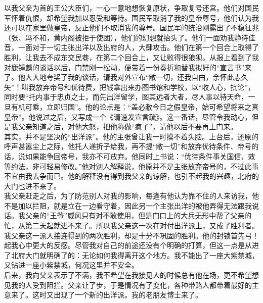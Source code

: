以我父亲为首的王公大臣们，一心一意地想恢复原状，争取复号还宫。他们对国民军怀着仇恨，却希望我加以忍受和等待。国民军取消了我的皇帝尊号，他们认为我还可以在家里做皇帝，反正他们不取消我的尊号。国民军的统治刚露出了不稳征兆（张、冯不和，黄内阁被拒于使团），他们的幻想就抬头了。他们一面劝我静待佳音，一面对于一切主张出洋以及出府的人，大肆攻击。他们在第一个回合上取得了胜利，让我去不成东交民巷，在第二个回合上，又让败得很狼狈。从报上看到了我对鹿锺麟的谈话以后，门禁刚一松动，便带着一份奏折和替我拟好的“宣言书”来了。他大大地夸奖了我的谈话，请我对外宣布“敝一切，还我自由，余怀此志久矢”！叫我放弃帝号和优待费，把钱拿出来办图书馆和学校，以“收人心，抗论”，同时要“托内事于忠贞之士，而先出洋留学，图其远者大者，尽人事以待天命，一旦有机可乘，立即归国”。他的论点是：“盖必敝今日之假皇帝，始可希望将来之真皇帝”。他说过之后，又写成一个《请速发宣言疏》。这一番话，尽管令我动心，但是我父亲知道之后，对他大怒，把他称做“疯子”，请他以后不要再上门来。\\

其实，并不是坚决的“出洋派”。他的主张曾让我一时摸不着头脑。上台后，还原的呼声甚嚣尘上之际，他托人递折子给我，再不提“敝一切”和放弃优待条件、帝号的话，说如果能争回帝号，我亦不可放弃。他同时上书说：“优待条件事关国信，效等约法，非可轻易修改。”他对别人解释说，他原并不是主张放弃帝号的，不过此事不宜由我去争而已。他的解释没有得到我父亲的谅解，也引不起我的兴趣，北府的大门也进不来了。\\

我父亲赶走之后，为了防范别人对我的影响，每逢有他认为靠不住的人来访我，他不是加以拦阻，就是立在一边看守着，因此另一个主张出洋的被他弄得无法跟我说话。我父亲的“王爷”威风只有对不敢使用，但是门口上的大兵无形中帮了父亲的忙，从第二天起就进不来了。所以我父亲这一次在对付出洋派上，又成了胜利者。\\

我父亲这一派人接连得到的两次胜利，却是十分不巩固的胜利。他的封锁首先弓！起我心中更大的反感。尽管我对自己的前途还没有个明确的打算，但这一点是从进了北府大门就明确了的：无论如何我得离开这个地方。我不能出了一座大紫禁城，又钻进一座小紫禁城，何况这里并不安全。\\

后来，我向父亲表示了不满，我不希望在我接见人的时候总有他在场，更不希望想见我的人受到阻拦。父亲让了步，于是情况有了变化，各种带路人都带着最好的主意来了。这时又出现了一个新的出洋派。我的老朋友博士来了。\\

